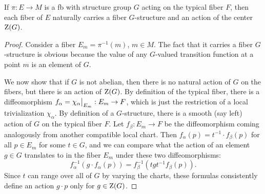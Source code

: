 \begin{prop}\label{prop G-fibers}
    If $\pi:E\to M$ is a \gls{fb} with structure group $G$ acting on the typical fiber $F$, then each fiber of $E$ naturally carries a fiber $G$-structure and an action of the center $\mathrm{Z}(G)$.
\end{prop}
\begin{proof}
    Consider a fiber $E_m=\pi^{-1}(m)$, $m\in M$. The fact that it carries a fiber $G$-structure is obvious because the value of any $G$-valued transition function at a point $m$ is an element of $G$. 
    
    We now show that if $G$ is not abelian, then there is no natural action of $G$ on the fibers, but there is an action of $\mathrm{Z}(G)$. By definition of the typical fiber, there is a diffeomorphism $f_\alpha=\restr{\chi_\alpha}{E_m}:E_m\to F$, which is just the restriction of a local trivialization $\chi_\alpha$. By definition of a $G$-structure, there is a smooth (say left) action of $G$ on the typical fiber $F$. Let $f_\beta:E_m\to F$ be the diffeomorphism coming analogously from another compatible local chart. Then $f_\alpha(p)=t^{-1}\cdot f_\beta(p)$ for all $p\in E_m$ for some $t\in G$, and we can compare what the action of an element $g\in G$ translates to in the fiber $E_m$ under these two diffeomorphisms:
    \[f_\alpha^{-1}(g\cdot f_\alpha(p))=f_\beta^{-1}(tgt^{-1} f_\beta(p)).\]
    Since $t$ can range over all of $G$ by varying the charts, these formulas consistently define an action $g\cdot p$ only for $g\in \mathrm{Z}(G)$.
\end{proof}

